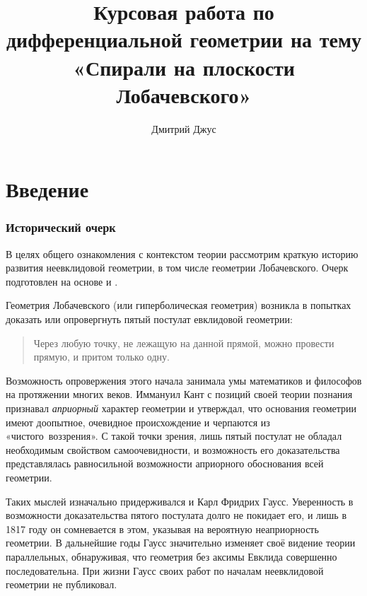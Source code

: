 \documentclass{article}
\numberwithin{equation}{section}
\begin{document}
\author{Дмитрий Джус}
\title{Курсовая работа по дифференциальной геометрии на тему \\
  «Спирали на плоскости Лобачевского»}
\pretitle{\begin{center}\Huge}
\posttitle{\par\end{center}\vskip 3pc}
\maketitle
\thispagestyle{empty}

\clearpage

\tableofcontents
\clearpage

\listoffigures
\clearpage

\part{Введение}

\section{Исторический очерк}
\label{sec:intro}

В целях общего ознакомления с контекстом теории рассмотрим краткую
историю развития неевклидовой геометрии, в том числе геометрии
Лобачевского. Очерк подготовлен на основе \cite{milnor82} и
\cite{norden56}.

Геометрия Лобачевского (или гиперболическая геометрия) возникла в
попытках доказать или опровергнуть пятый постулат евклидовой
геометрии:

\begin{quote}
  Через любую точку, не лежащую на данной прямой, можно провести
  прямую, и притом только одну.
\end{quote}

Возможность опровержения этого начала занимала умы математиков и
философов на протяжении многих веков. Иммануил Кант с позиций своей
теории познания признавал \emph{априорный} характер геометрии и
утверждал, что основания геометрии имеют доопытное, очевидное
происхождение и черпаются из «чистого воззрения». С такой точки
зрения, лишь пятый постулат не обладал необходимым свойством
самоочевидности, и возможность его доказательства представлялась
равносильной возможности априорного обоснования всей геометрии.

Таких мыслей изначально придерживался и Карл Фридрих Гаусс.
Уверенность в возможности доказательства пятого постулата долго не
покидает его, и лишь в 1817 году он сомневается в этом, указывая на
вероятную неаприорность геометрии. В дальнейшие годы Гаусс значительно
изменяет своё видение теории параллельных, обнаруживая, что геометрия
без аксимы Евклида совершенно последовательна. При жизни Гаусс своих
работ по началам неевклидовой геометрии не публиковал.
\end{document}
